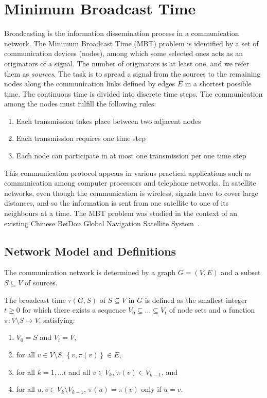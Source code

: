 \chapter{Minimum Broadcast Time}\label{sec:mbt}

Broadcasting is the information dissemination process in a communication network.
The Minimum Broadcast Time (MBT) problem is identified by a set of communication devices (nodes), among which some selected ones acts as an originators of a signal.
The number of originators is at least one, and we refer them as \emph{sources}.
The task is to spread a signal from the sources to the remaining nodes along the communication links defined by edges $E$ in a shortest possible time.
The continuous time is divided into discrete time steps.
The communication among the nodes must fulfill the following rules:
\begin{enumerate}
\item Each transmission takes place between two adjacent nodes
\item Each transmission requires one time step
\item Each node can participate in at most one transmission per one time step
\end{enumerate}

This communication protocol appears in various practical applications such as communication among computer processors and telephone networks.
In satellite networks, even though the communication is wireless, signals have to cover large distances, 
and so the information is sent from one satellite to one of its neighbours at a time.
The MBT problem was studied in the context of an existing Chinese BeiDou Global Navigation Satellite System~\cite{chu17}.

\section{Network Model and Definitions}

The communication network is determined by a graph $G=(V,E)$ and a subset $S\subseteq V$ of sources.

\begin{definition}
The broadcast time $\tau(G,S)$ of $S\subseteq V$ in $G$ is defined as the smallest integer $t\geq 0$
for which there exists a sequence $V_0\subseteq\dots\subseteq V_t$ of node sets and a function $\pi:V\setminus S\mapsto V$, satisfying:
\begin{enumerate}
\item $V_0=S$ and $V_t=V$,
\item for all $v\in V\setminus S, \left\{v,\pi(v)\right\}\in E$,
\item for all $k=1,\dots t$ and all $v\in V_k$, $\pi(v)\in V_{k-1}$, and
\item for all $u,v\in V_k\setminus V_{k-1}$, $\pi(u)=\pi(v)$ only if $u=v$.
\end{enumerate}
\end{definition}

